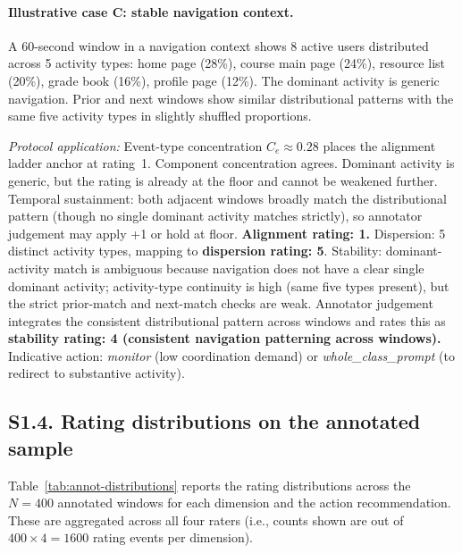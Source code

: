 \documentclass[preprint,12pt,authoryear]{elsarticle}
\begin{document}
\paragraph{Illustrative case C: stable navigation context.}
A 60-second window in a navigation context shows 8 active users distributed across 5 activity types: home page (28\%), course main page (24\%), resource list (20\%), grade book (16\%), profile page (12\%). The dominant activity is generic navigation. Prior and next windows show similar distributional patterns with the same five activity types in slightly shuffled proportions.

\textit{Protocol application:} Event-type concentration $C_e \approx 0.28$ places the alignment ladder anchor at rating~1. Component concentration agrees. Dominant activity is generic, but the rating is already at the floor and cannot be weakened further. Temporal sustainment: both adjacent windows broadly match the distributional pattern (though no single dominant activity matches strictly), so annotator judgement may apply +1 or hold at floor. \textbf{Alignment rating: 1.} Dispersion: 5 distinct activity types, mapping to \textbf{dispersion rating: 5}. Stability: dominant-activity match is ambiguous because navigation does not have a clear single dominant activity; activity-type continuity is high (same five types present), but the strict prior-match and next-match checks are weak. Annotator judgement integrates the consistent distributional pattern across windows and rates this as \textbf{stability rating: 4 (consistent navigation patterning across windows).} Indicative action: \textit{monitor} (low coordination demand) or \textit{whole\_class\_prompt} (to redirect to substantive activity).

\subsection*{S1.4. Rating distributions on the annotated sample}
\label{supp:annotation-distributions}

Table~\ref{tab:annot-distributions} reports the rating distributions across the $N = 400$ annotated windows for each dimension and the action recommendation. These are aggregated across all four raters (i.e., counts shown are out of $400 \times 4 = 1600$ rating events per dimension).
\end{document}
